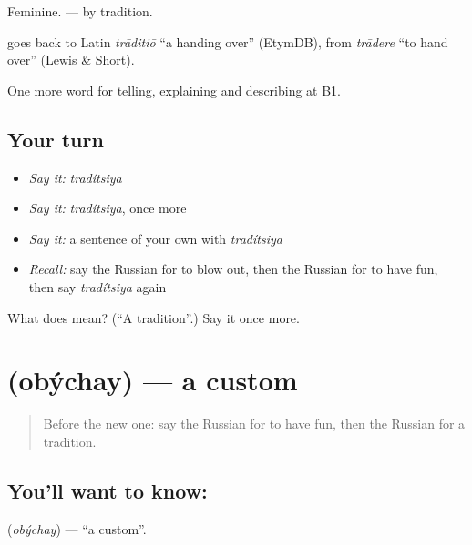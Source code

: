 Feminine. \emph{ } — by tradition.

\begin{cousinweb}
\emph{} goes back to Latin \emph{trāditiō} \textquotedblleft{}a handing over\textquotedblright{} (EtymDB), from \emph{trādere} \textquotedblleft{}to hand over\textquotedblright{} (Lewis \& Short).
\end{cousinweb}

\begin{grammarlens}[title={What you've built}]
One more word for telling, explaining and describing at B1.
\end{grammarlens}

\subsection*{Your turn}
\begin{itemize}
\raggedright
  \item \emph{Say it:} \emph{tradítsiya}
  \item \emph{Say it:} \emph{tradítsiya}, once more
  \item \emph{Say it:} a sentence of your own with \emph{tradítsiya}
  \item \emph{Recall:} say the Russian for to blow out, then the Russian for to have fun, then say \emph{tradítsiya} again
\end{itemize}

\begin{tcolorbox}[breakable,colback=teal!4,colframe=teal!35!black,title={Before you move on}]
What does  mean? (\textquotedblleft{}A tradition\textquotedblright{}.) Say it once more.
\end{tcolorbox}
\section[\texorpdfstring{\ru{обычай} (obýchay)}{обычай (obýchay)}]{ (obýchay) — a custom}

\label{lesson:RU-C318-obychay}



\begin{quote}
Before the new one: say the Russian for to have fun, then the Russian for a tradition.
\end{quote}

\subsection*{You'll want to know: }
\textbf{} (\emph{obýchay}) — \textquotedblleft{}a custom\textquotedblright{}.

